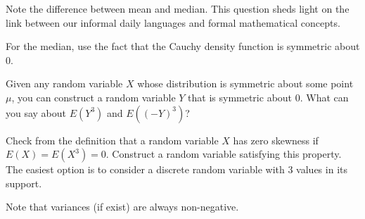 \begin{Hint}{1.2}
			Note the difference between mean and median. This question sheds light on the link between our informal daily languages and formal mathematical concepts.
		
\end{Hint}
\begin{Hint}{1.5}
			For the median, use the fact that the Cauchy density function is symmetric about $0$.
		
\end{Hint}
\begin{Hint}{1.6}
			Given any random variable $X$ whose distribution is symmetric about some point $\mu$, you can construct a random variable $Y$ that is symmetric about 0. What can you say about $E(Y^3)$ and $E((-Y)^3)$?
		
\end{Hint}
\begin{Hint}{1.7}
			Check from the definition that a random variable $X$ has zero skewness if $E(X) = E(X^3) = 0$. Construct a random variable satisfying this property. The easiest option is to consider a discrete random variable with 3 values in its support.
		
\end{Hint}
\begin{Hint}{1.9}
			Note that variances (if exist) are always non-negative.
		
\end{Hint}
